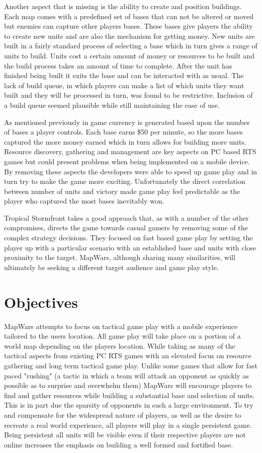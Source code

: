 Another aspect that is missing is the ability to create and position buildings. Each map comes with a predefined set of bases that can not be altered or moved but enemies can capture other players bases. These bases give players the ability to create new units and are also the mechanism for getting money. New units are built in a fairly standard process of selecting a base which in turn gives a range of units to build. Units cost a certain amount of money or resources to be built and the build process takes an amount of time to complete. After the unit has finished being built it exits the base and can be interacted with as usual. The lack of build queue, in which players can make a list of which units they want built and they will be processed in turn, was found to be restrictive. Inclusion of a build queue seemed plausible while still maintaining the ease of use.

As mentioned previously in game currency is generated based upon the number of bases a player controls. Each base earns \$50 per minute, so the more bases captured the more money earned which in turn allows for building more units. Resource discovery, gathering and management are key aspects on PC based RTS games but could present problems when being implemented on a mobile device. By removing these aspects the developers were able to speed up game play and in turn try to make the game more exciting. Unfortunately the direct correlation between number of units and victory made game play feel predictable as the player who captured the most bases inevitably won.

Tropical Stormfront takes a good approach that, as with a number of the other compromises, directs the game towards casual gamers by removing some of the complex strategy decisions. They focused on fast based game play by setting the player up with a particular scenario with an established base and units with close proximity to the target. MapWars, although sharing many similarities, will ultimately be seeking a different target audience and game play style.


\section{Objectives}
MapWars attempts to focus on tactical game play with a mobile experience tailored to the users location. All game play will take place on a portion of a world map depending on the players location. While taking as many of the tactical aspects from existing PC RTS games with an elevated focus on resource gathering and long term tactical game play. Unlike some games that allow for fast paced "rushing" (a tactic in which a team will attack an opponent as quickly as possible as to surprise and overwhelm them) MapWars will encourage players to find and gather resources while building a substantial base and selection of units. This is in part due the sparsity of opponents in such a large environment. To try and compensate for the widespread nature of players, as well as the desire to recreate a real world experience, all players will play in a single persistent game. Being persistent all units will be visible even if their respective players are not online increases the emphasis on building a well formed and fortified base.

